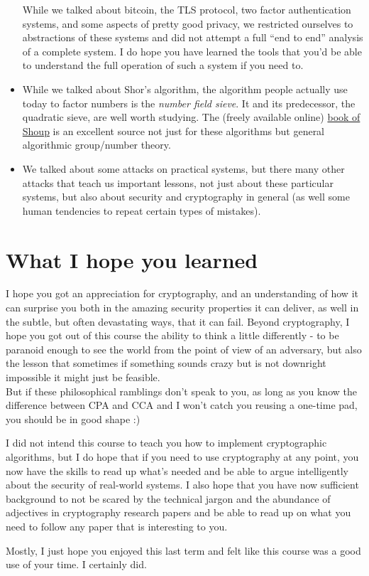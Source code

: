 \begin{itemize}
  While we talked about bitcoin, the TLS protocol, two factor
  authentication systems, and some aspects of pretty good privacy, we
  restricted ourselves to abstractions of these systems and did not
  attempt a full ``end to end'' analysis of a complete system. I do hope
  you have learned the tools that you'd be able to understand the full
  operation of such a system if you need to.
\item
  While we talked about Shor's algorithm, the algorithm people actually
  use today to factor numbers is the \emph{number field sieve}. It and
  its predecessor, the quadratic sieve, are well worth studying. The
  (freely available online) \href{http://www.shoup.net/ntb/}{book of
  Shoup} is an excellent source not just for these algorithms but
  general algorithmic group/number theory.
\item
  We talked about some attacks on practical systems, but there many
  other attacks that teach us important lessons, not just about these
  particular systems, but also about security and cryptography in
  general (as well some human tendencies to repeat certain types of
  mistakes).
\end{itemize}

\section{What I hope you learned}\label{24-What-I-hope-you-learne}

I hope you got an appreciation for cryptography, and an understanding of
how it can surprise you both in the amazing security properties it can
deliver, as well in the subtle, but often devastating ways, that it can
fail. Beyond cryptography, I hope you got out of this course the ability
to think a little differently - to be paranoid enough to see the world
from the point of view of an adversary, but also the lesson that
sometimes if something sounds crazy but is not downright impossible it
might just be feasible.\\
But if these philosophical ramblings don't speak to you, as long as you
know the difference between CPA and CCA and I won't catch you reusing a
one-time pad, you should be in good shape :)

I did not intend this course to teach you how to implement cryptographic
algorithms, but I do hope that if you need to use cryptography at any
point, you now have the skills to read up what's needed and be able to
argue intelligently about the security of real-world systems. I also
hope that you have now sufficient background to not be scared by the
technical jargon and the abundance of adjectives in cryptography
research papers and be able to read up on what you need to follow any
paper that is interesting to you.

Mostly, I just hope you enjoyed this last term and felt like this course
was a good use of your time. I certainly did.
